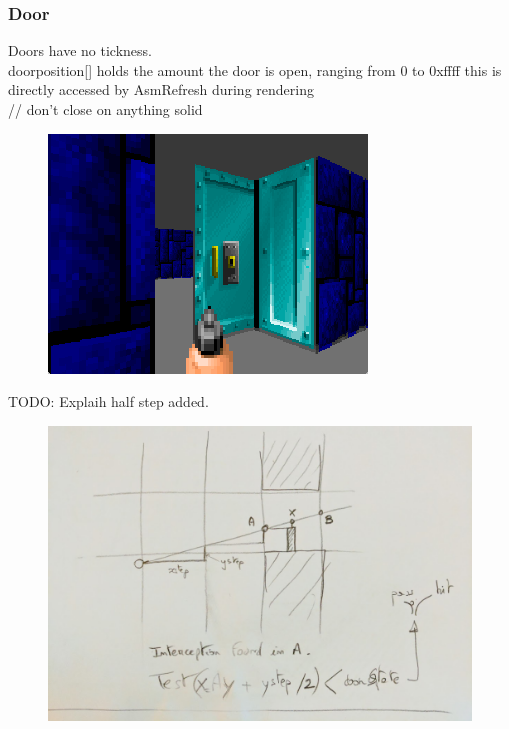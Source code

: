  





\subsubsection{Door}
Doors have no tickness.\\
doorposition[] holds the amount the door is open, ranging from 0 to 0xffff
  this is directly accessed by AsmRefresh during rendering\\
  // don't close on anything solid\\
\begin{figure}[H]
 \centering
 \includegraphics[width=\textwidth]{imgs/door_flat.png}
\end{figure}

\par
TODO: Explaih half step added.\\
\par 
 \par
\begin{figure}[H]
  \centering
 \includegraphics[width=\textwidth]{imgs/test_door.png}
\end{figure}
\par












